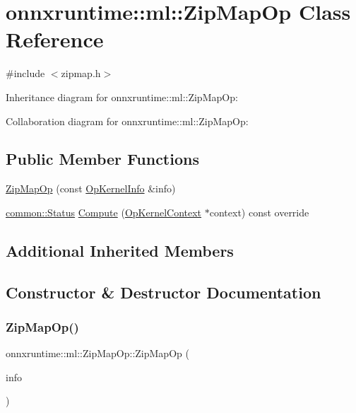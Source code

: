 \hypertarget{classonnxruntime_1_1ml_1_1ZipMapOp}{}\section{onnxruntime\+:\+:ml\+:\+:Zip\+Map\+Op Class Reference}
\label{classonnxruntime_1_1ml_1_1ZipMapOp}


{\ttfamily \#include $<$zipmap.\+h$>$}



Inheritance diagram for onnxruntime\+:\+:ml\+:\+:Zip\+Map\+Op\+:


Collaboration diagram for onnxruntime\+:\+:ml\+:\+:Zip\+Map\+Op\+:
\subsection*{Public Member Functions}
\begin{DoxyCompactItemize}
\item 
\mbox{\hyperlink{classonnxruntime_1_1ml_1_1ZipMapOp_aacdb8fa170eab33ae4e037bf7d512286}{Zip\+Map\+Op}} (const \mbox{\hyperlink{classonnxruntime_1_1OpKernelInfo}{Op\+Kernel\+Info}} \&info)
\item 
\mbox{\hyperlink{classonnxruntime_1_1common_1_1Status}{common\+::\+Status}} \mbox{\hyperlink{classonnxruntime_1_1ml_1_1ZipMapOp_a63bf02989d89129fb7443ad0fbd9ae45}{Compute}} (\mbox{\hyperlink{classonnxruntime_1_1OpKernelContext}{Op\+Kernel\+Context}} $\ast$context) const override
\end{DoxyCompactItemize}
\subsection*{Additional Inherited Members}


\subsection{Constructor \& Destructor Documentation}
\mbox{\label{classonnxruntime_1_1ml_1_1ZipMapOp_aacdb8fa170eab33ae4e037bf7d512286}} 
\subsubsection{\texorpdfstring{Zip\+Map\+Op()}{ZipMapOp()}}
{\footnotesize\ttfamily onnxruntime\+::ml\+::\+Zip\+Map\+Op\+::\+Zip\+Map\+Op (\begin{DoxyParamCaption}\item[{const \mbox{\hyperlink{classonnxruntime_1_1OpKernelInfo}{Op\+Kernel\+Info}} \&}]{info }\end{DoxyParamCaption})\hspace{0.3cm}{\ttfamily [explicit]}}



